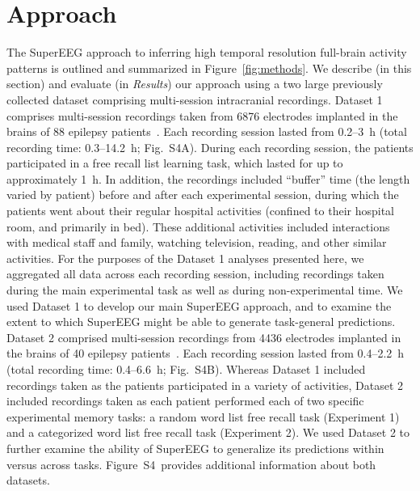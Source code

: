 \documentclass[11pt]{article}
\newcommand{\suppstats}{S4}
\begin{document}
\section*{Approach}
The SuperEEG approach to inferring high temporal resolution full-brain
activity patterns is outlined and summarized in
Figure~\ref{fig:methods}. We describe (in this section) and evaluate
(in \textit{Results}) our approach using a two large previously
collected dataset comprising multi-session intracranial recordings.
Dataset 1 comprises multi-session recordings taken from 6876
electrodes implanted in the brains of 88 epilepsy
patients~\cite{SedeEtal03, SedeEtal07a, SedeEtal07b, MannEtal11,
  MannEtal12}.  Each recording session lasted from 0.2--3~h (total
recording time: 0.3--14.2~h; Fig.~\suppstats A).  During each
recording session, the patients participated in a free recall list
learning task, which lasted for up to approximately 1~h.  In addition,
the recordings included ``buffer'' time (the length varied by patient)
before and after each experimental session, during which the patients
went about their regular hospital activities (confined to their
hospital room, and primarily in bed).  These additional activities
included interactions with medical staff and family, watching
television, reading, and other similar activities.  For the purposes
of the Dataset 1 analyses presented here, we aggregated all data
across each recording session, including recordings taken during the
main experimental task as well as during non-experimental time.  We
used Dataset 1 to develop our main SuperEEG approach, and to examine
the extent to which SuperEEG might be able to generate task-general
predictions.  Dataset 2 comprised multi-session recordings from 4436
electrodes implanted in the brains of 40 epilepsy
patients~\citep{EzzyEtal17, HoraEtal17, KragEtal17, KuceEtal17,
  LinEtal17, SoloEtal18, WeidEtal18, EzzyEtal18, KuceEtal18}.  Each
recording session lasted from 0.4--2.2~h (total recording time:
0.4--6.6~h; Fig.~\suppstats B).  Whereas Dataset 1 included recordings
taken as the patients participated in a variety of activities, Dataset
2 included recordings taken as each patient performed each of two
specific experimental memory tasks: a random word list free recall
task (Experiment 1) and a categorized word list free recall task
(Experiment 2).  We used Dataset 2
to further examine the ability of SuperEEG to generalize its
predictions within versus across tasks.  Figure~\suppstats~provides
additional information about both datasets.
\end{document}
